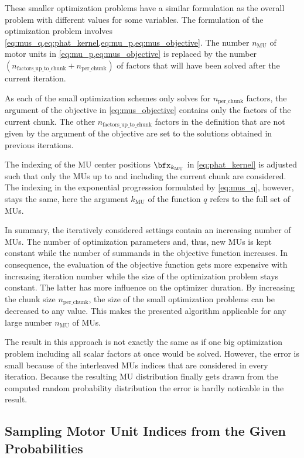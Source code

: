 These smaller optimization problems have a similar formulation as the overall problem with different values for some variables.
The formulation of the optimization problem involves \cref{eq:mus_q,eq:phat_kernel,eq:mu_p,eq:mus_objective}. 
The number $n_\text{MU}$ of motor units in \cref{eq:mu_p,eq:mus_objective} is replaced by the number $(n_\text{factors\_up\_to\_chunk}+n_\text{per\_chunk})$ of factors that will have been solved after the current iteration. 

As each of the small optimization schemes only solves for $n_\text{per\_chunk}$ factors, the argument of the objective in \cref{eq:mus_objective} contains only the factors of the current chunk.
The other $n_\text{factors\_up\_to\_chunk}$ factors in the definition that are not given by the argument of the objective are set to the solutions obtained in previous iterations.

The indexing of the MU center positions $\bfx_{k_\text{MU}}$ in \cref{eq:phat_kernel} is adjusted such that only the MUs up to and including the current chunk are considered. The indexing in the exponential progression formulated by \cref{eq:mus_q}, however, stays the same, here the argument $k_\text{MU}$ of the function $q$ refers to the full set of MUs.

In summary, the iteratively considered settings contain an increasing number of MUs. The number of optimization parameters and, thus, new MUs is kept constant while the number of summands in the objective function increases. In consequence, the evaluation of the objective function gets more expensive with increasing iteration number while the size of the optimization problem stays constant. The latter has more influence on the optimizer duration.
By increasing the chunk size $n_\text{per\_chunk}$, the size of the small optimization problems can be decreased to any value. This makes the presented algorithm applicable for any large number $n_\text{MU}$ of MUs.

The result in this approach is not exactly the same as if one big optimization problem including all scalar factors at once would be solved. However, the error is small because of the interleaved MUs indices that are considered in every iteration. Because the resulting MU distribution finally gets drawn from the computed random probability distribution the error is hardly noticable in the result.

\subsection{Sampling Motor Unit Indices from the Given Probabilities}

